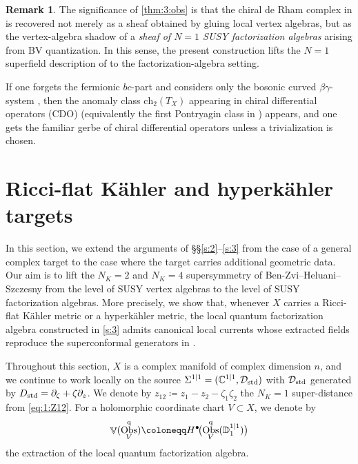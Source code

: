 \documentclass[final,reqno]{amsart}
\numberwithin{equation}{section}
\theoremstyle{definition}
\newtheorem{rmk}[thm]{Remark}
\newcommand{\bl}{\bullet}
\newcommand{\ceq}{\coloneqq} %
\newcommand{\std}{\textup{std}}
\newcommand{\sC}{\mathbb{C}^{1|1}}
\newcommand{\sD}{\mathbb{D}^{1|1}}
\newcommand{\clD}{\mathcal{D}}
\newcommand{\pd}{\partial}
\newcommand{\sSig}{\Sigma^{1|1}}
\newcommand{\qObs}[1]{\mathop{\Obs^{\textup{q}}_{#1}}}
\DeclareMathOperator{\bbV}{\mathbb{V}}
\DeclareMathOperator{\Obs}{Obs}
\begin{document}
\begin{rmk}\label{rmk:3:BHS}
The significance of \cref{thm:3:obs} is that the chiral de Rham complex 
in \cite{MSV,GMS3,BHS} is recovered not merely as a sheaf obtained 
by gluing local vertex algebras, but as the vertex-algebra shadow of a 
\emph{sheaf of $N=1$ SUSY factorization algebras} arising from BV quantization. 
In this sense, the present construction lifts the $N=1$ superfield description 
of \cite{BHS} to the factorization-algebra setting.

If one forgets the fermionic $bc$-part and 
considers only the bosonic curved $\beta\gamma$-system \cite{GGW,Ne,W}, 
then the anomaly class $\mathrm{ch}_2(T_X)$ appearing in 
chiral differential operators (CDO) \cite{GMS1,GMS2}
(equivalently the first Pontryagin class in \cite{B}) appears, 
and one gets the familiar gerbe of chiral differential operators 
unless a trivialization is chosen.
\end{rmk}


\section{Ricci-flat K\"ahler and hyperk\"ahler targets}
\label{s:4}

In this section, we extend the arguments of \S\S\ref{s:2}--\ref{s:3} 
from the case of a general complex target to the case 
where the target carries additional geometric data.
Our aim is to lift the $N_K=2$ and $N_K=4$ supersymmetry of
Ben-Zvi--Heluani--Szczesny from the level of SUSY vertex algebras 
to the level of SUSY factorization algebras. 
More precisely, we show that, whenever $X$ carries a Ricci-flat K\"ahler 
metric or a hyperk\"ahler metric, the local quantum factorization algebra
constructed in \cref{s:3} admits canonical local currents
whose extracted fields reproduce the superconformal generators in \cite{BHS}.

Throughout this section, $X$ is a complex manifold of complex dimension $n$,
and we continue to work locally on the source $\sSig = (\sC,\clD_{\std})$ 
with $\clD_{\std}$ generated by $D_{\std}=\pd_\zeta+\zeta\pd_z$.
We denote by $z_{12} \ceq z_1-z_2-\zeta_1\zeta_2$
the $N_K=1$ super-distance from \cref{eq:1:Z12}. 
For a holomorphic coordinate chart $V \subset X$, we denote by
\begin{align}\label{eq:4:bbVqV}
 \bbV(\qObs{V}) \ceq H^{\bl}\!\bigl(\qObs{V}(\sD_1)\bigr)
\end{align}
the extraction of the local quantum factorization algebra.
\end{document}
